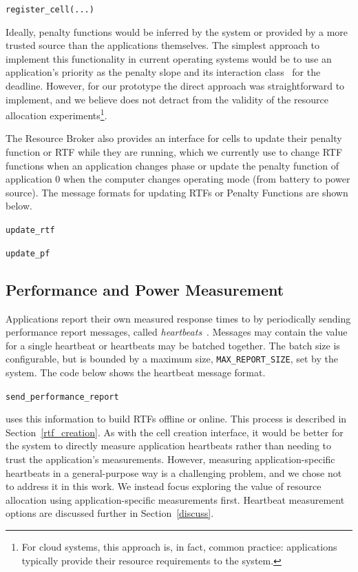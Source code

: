 \texttt{register\_cell(...)}


Ideally, penalty functions would be inferred by the system or provided by a
more trusted source than the applications themselves.  The simplest approach to implement this functionality in current operating systems would be to use an application's priority as the penalty slope and its interaction class~\cite{interaction_class} for the deadline. However, for our prototype the direct approach was straightforward to implement, and we believe does not detract from the validity of the resource allocation experiments\footnote{For cloud systems, this approach is, in fact, common practice: applications typically provide their resource requirements to the system.}.  


The Resource Broker also provides an interface for cells to update their penalty function or RTF while they are running, which we currently use to change RTF functions when an application changes phase or update the penalty function of application 0 when the computer changes operating mode (\ie from battery to power source).  The message formats for updating RTFs or Penalty Functions are shown below.

\texttt{update\_rtf}

\texttt{update\_pf}

\subsection{Performance and Power Measurement}
Applications report their own measured response times to \pacora by periodically sending performance report messages, called \emph{heartbeats}~\cite{hoffmann2011}.  Messages may contain the value for a single heartbeat or heartbeats may be batched together.  The batch size is configurable, but is bounded by a maximum size, \texttt{MAX\_REPORT\_SIZE}, set by the system.   The code below shows the heartbeat message format.

\texttt{send\_performance\_report}

\pacora uses this information to build RTFs offline or online.  This process is described in Section~\ref{rtf_creation}.  As with the cell creation interface, it would be better for the system to directly measure application heartbeats rather than needing to trust the application's measurements.  However, measuring application-specific heartbeats in a general-purpose way is a challenging problem, and we chose not to address it in this work.  We instead focus exploring the value of resource allocation using application-specific measurements first.  Heartbeat measurement options are discussed further in Section~\ref{discuss}.

